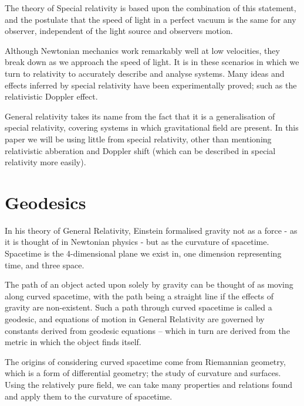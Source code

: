 \documentclass[oneside,openright,frontopenright, singlespacing]{dmathesis}
\begin{document}
\vspace{1em}
	The theory of Special relativity is based upon the combination of this statement, and the postulate that the speed of light in a perfect vacuum is the same for any observer, independent of the light source and observers motion.

\vspace{1em}
	Although Newtonian mechanics work remarkably well at low velocities, they break down as we approach the speed of light. It is in these scenarios in which we turn to relativity to accurately describe and analyse systems. Many ideas and effects inferred by special relativity have been experimentally proved; such as the relativistic Doppler effect.

\vspace{1em}
	General relativity takes its name from the fact that it is a generalisation of special relativity, covering systems in which gravitational field are present. In this paper we will be using little from special relativity, other than mentioning relativistic abberation and Doppler shift (which can be described in special relativity more easily).

\section{Geodesics}

	In his theory of General Relativity, Einstein formalised gravity not as a force - as it is thought of in Newtonian physics - but as the curvature of spacetime. Spacetime is the 4-dimensional plane we exist in, one dimension representing time, and three space. 

\vspace{1em}
	The path of an object acted upon solely by gravity can be thought of as moving along curved spacetime, with the path being a straight line if the effects of gravity are non-existent. Such a path through curved spacetime is called a geodesic, and equations of motion in General Relativity are governed by constants derived from geodesic equations – which in turn are derived from the metric in which the object finds itself. 

\vspace{1em}
	The origins of considering curved spacetime come from Riemannian geometry, which is a form of differential geometry; the study of curvature and surfaces. Using the relatively pure field, we can take many properties and relations found and apply them to the curvature of spacetime.
\end{document}
